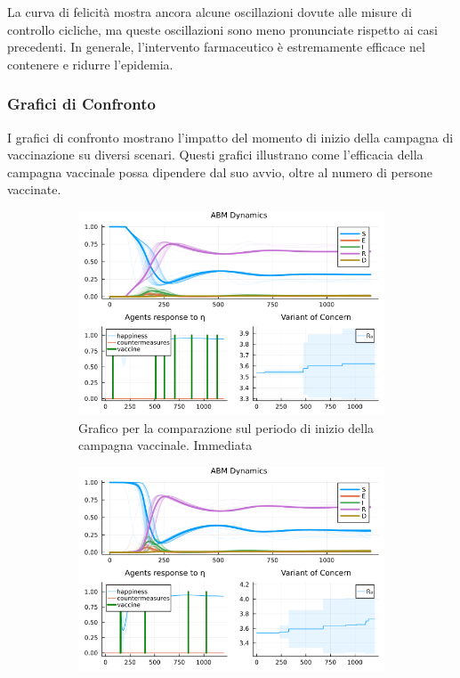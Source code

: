 La curva di felicità mostra ancora alcune oscillazioni dovute alle 
misure di controllo cicliche, ma queste oscillazioni sono meno 
pronunciate rispetto ai casi precedenti. In generale, l'intervento 
farmaceutico è estremamente efficace nel contenere e ridurre l'epidemia.

\subsubsection{Grafici di Confronto}

I grafici di confronto mostrano l'impatto del momento di inizio della 
campagna di vaccinazione su diversi scenari. Questi grafici illustrano 
come l'efficacia della campagna vaccinale possa dipendere dal suo avvio, 
oltre al numero di persone vaccinate.

\begin{figure}[H]
	\centering
	\begin{subfigure}[b]{0.45\textwidth}
		\centering
		\includegraphics[width=\textwidth]{img/SocialNetworkABM_1_V.png}
		\caption{Grafico per la comparazione sul periodo di inizio della campagna vaccinale. Immediata}
		\label{fig:comparison_vax_1}
	\end{subfigure}
	\hfill
	\begin{subfigure}[b]{0.45\textwidth}
		\centering
		\includegraphics[width=\textwidth]{img/SocialNetworkABM_4_V.png}

\end{subfigure}
\end{figure}
